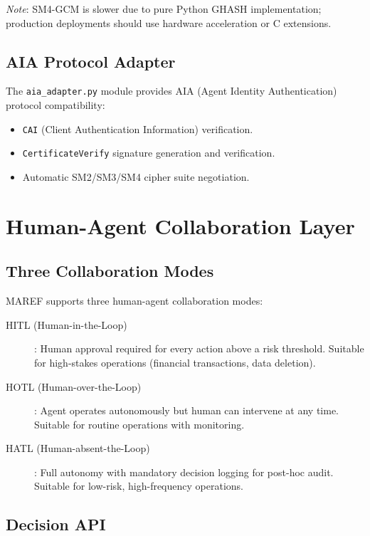 \documentclass[11pt,a4paper]{article}
\begin{document}
\noindent\textit{Note}: SM4-GCM is slower due to pure Python GHASH implementation; production deployments should use hardware acceleration or C extensions.

\subsection{AIA Protocol Adapter}

The \texttt{aia\_adapter.py} module provides AIA (Agent Identity Authentication) protocol compatibility:

\begin{itemize}
  \item \texttt{CAI} (Client Authentication Information) verification.
  \item \texttt{CertificateVerify} signature generation and verification.
  \item Automatic SM2/SM3/SM4 cipher suite negotiation.
\end{itemize}

\section{Human-Agent Collaboration Layer}
\label{sec:human}

\subsection{Three Collaboration Modes}

MAREF supports three human-agent collaboration modes:

\begin{description}
  \item[HITL (Human-in-the-Loop)]: Human approval required for every action above a risk threshold. Suitable for high-stakes operations (financial transactions, data deletion).
  \item[HOTL (Human-over-the-Loop)]: Agent operates autonomously but human can intervene at any time. Suitable for routine operations with monitoring.
  \item[HATL (Human-absent-the-Loop)]: Full autonomy with mandatory decision logging for post-hoc audit. Suitable for low-risk, high-frequency operations.
\end{description}

\subsection{Decision API}
\end{document}
